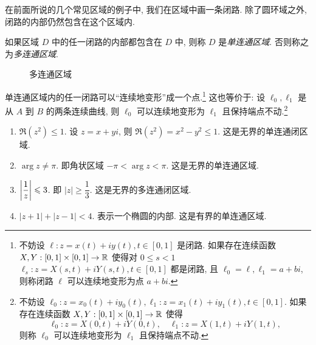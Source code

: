 在前面所说的几个常见区域的例子中, 我们在区域中画一条闭路.
除了圆环域之外, 闭路的内部仍然包含在这个区域内.

\begin{definition}
  如果区域 $D$ 中的任一闭路的内部都包含在 $D$ 中, 则称 $D$ 是\emph{单连通区域}.
  否则称之为\emph{多连通区域}.
\end{definition}

\begin{figure}[hbpt]
  \centering
  \caption{多连通区域}
\end{figure}

单连通区域内的任一闭路可以``连续地变形''成一个点.\footnote{不妨设 $\ell: z=x(t)+iy(t),t\in[0,1]$ 是闭路.
如果存在连续函数 $X,Y:[0,1]\times[0,1]\to {\mathbb{R}}$ 使得对 $0\le s<1$
$\ell_s: z=X(s,t)+iY(s,t),t\in[0,1]$
都是闭路, 且 $\ell_0=\ell,\ell_1=a+bi$,
则称闭路 $\ell$ 可以连续地变形为点 $a+bi$.}
这也等价于: 设 $\ell_0,\ell_1$ 是从 $A$ 到 $B$ 的两条连续曲线, 则 $\ell_0$ 可以连续地变形为 $\ell_1$ 且保持端点不动.\footnote{不妨设 $\ell_0: z=x_0(t)+iy_0(t),\ell_1: z=x_1(t)+iy_1(t),t\in[0,1]$.
如果存在连续函数 $X,Y:[0,1]\times[0,1]\to {\mathbb{R}}$ 使得
\[\ell_0: z=X(0,t)+iY(0,t),\quad \ell_1: z=X(1,t)+iY(1,t),\]
则称 $\ell_0$ 可以连续地变形为 $\ell_1$ 且保持端点不动.
}

\begin{example}
  \begin{enumerate}
    \item $\Re(z^2)\le1$. 设 $z=x+yi$, 则 $\Re(z^2)=x^2-y^2\le1$. 这是无界的单连通闭区域.
    \item $\arg z\neq \pi$. 即角状区域 $-\pi<\arg z<\pi$. 这是无界的单连通区域.
    \item $\left|\dfrac1z\right|\leqslant3$. 即 $|z|\ge\dfrac13$. 这是无界的多连通闭区域.
    \item $|z+1|+|z-1|<4$. 表示一个椭圆的内部. 这是有界的单连通区域.
  \end{enumerate}
\end{example}

